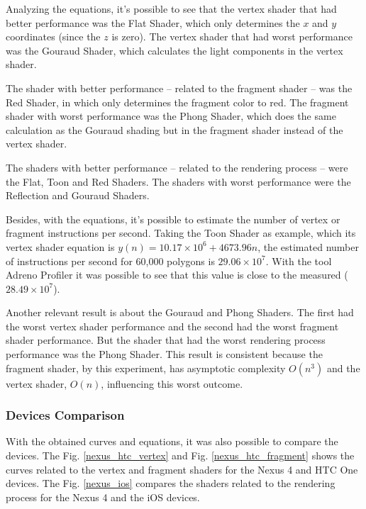 \documentclass[10pt, conference, compsocconf]{IEEEtran}
\begin{document}
 Analyzing the equations, it's possible to see that the vertex shader that
had better performance was the Flat Shader, which only determines the 
$x$ and $y$ coordinates (since the $z$ is zero). The vertex shader that had worst performance was the 
Gouraud Shader, which calculates the light components in the vertex shader.

 The shader with better performance -- related to the fragment shader -- was
the Red Shader, in which only determines the fragment color to red. The fragment shader with worst performance was the Phong Shader, which
does the same calculation as the Gouraud shading but in the fragment shader
instead of the vertex shader.

 The shaders with better performance -- related to the rendering process -- 
were the Flat, Toon and Red Shaders. The shaders with worst performance were 
the Reflection and Gouraud Shaders.

 Besides, with the equations, it's possible to estimate
the number of vertex or fragment instructions per second. Taking the Toon
Shader as example, which its vertex shader equation is 
$y(n) = 10.17 \times 10^6 + 4673.96n$, the estimated number of instructions 
per second for 60,000 polygons is $29.06 \times 10^7$. With the tool Adreno 
Profiler it was possible to see that this value is close
to the measured ($28.49 \times 10^7$).

 Another relevant result is about the Gouraud and Phong Shaders. The first had
the worst vertex shader performance and the second had the worst fragment 
shader performance. But the shader that had the worst rendering process 
performance was the Phong Shader. This result is consistent because the
fragment shader, by this experiment, has asymptotic complexity $O(n^3)$ and
the vertex shader, $O(n)$, influencing this worst outcome.

\subsubsection{Devices Comparison}

With the obtained curves and equations, it was also possible to compare
the devices. The Fig. \ref{nexus_htc_vertex} and Fig. \ref{nexus_htc_fragment} 
shows the curves related to the
vertex and fragment shaders for the Nexus 4 and HTC One devices. The
Fig. \ref{nexus_ios} compares the shaders related to the rendering process
for the Nexus 4 and the iOS devices.
\end{document}
